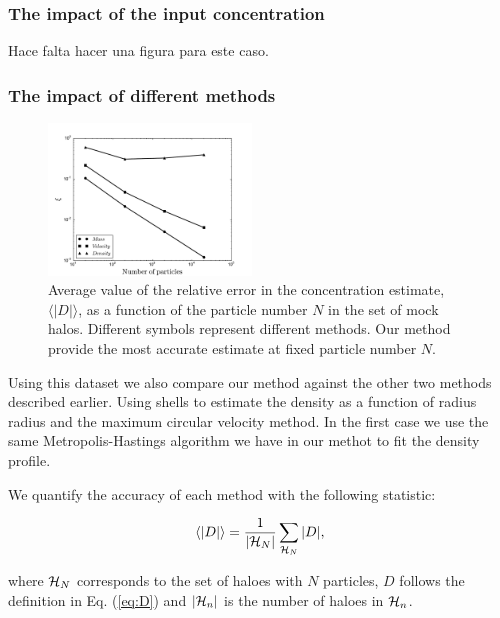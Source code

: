 \documentclass[useAMS,usenatbib]{mn2e}
\newcommand{\avg}[1]{\langle{#1}\rangle}
\begin{document}
\subsubsection{The impact of the input concentration}

Hace falta hacer una figura para este caso.

\subsubsection{The impact of different methods}

\begin{figure}
\begin{center}
  \includegraphics[width=0.48\textwidth]{error.pdf}
\end{center}
\caption{Average value of the relative error in the concentration
  estimate, $\avg{|D|}$, as a function of the particle number $N$ in
  the set of mock halos. Different symbols represent different
  methods. Our method provide the most accurate estimate at fixed
  particle number $N$. 
    \label{fig:error}}
\end{figure}

Using this dataset we also compare our method against the other two
methods described earlier. Using shells to estimate the density as a
function of radius radius and the maximum circular velocity method.
In the first case we use the same Metropolis-Hastings algorithm we
have in our methot to fit the density profile. 

We quantify the accuracy of each method with the following statistic:

\begin{equation}
\avg{|D|}=\frac{1}{\left|{\cal{H}}_N\right|}\sum_{{\cal{H}}_N} |D|,
\end{equation}

where ${\cal{H}}_N$ corresponds to the set of haloes with $N$
particles, $D$ follows the definition in Eq. (\ref{eq:D}) and
$\left|{\cal{H}}_n\right|$ is the number of haloes in ${\cal{H}}_n$. 
\end{document}
